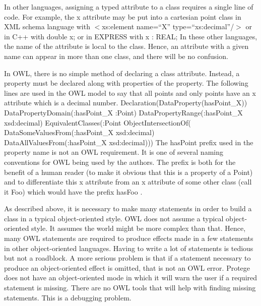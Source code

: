 In other languages, assigning a typed attribute to a class requires a
single line of code. For example, the x attribute may be put into a
cartesian point class in XML schema language with
\newline \sf $<$xs:element name=``X'' type=``xs:decimal''/$>$\rm
\newline or in C++ with
\newline \sf double x; \rm
\newline or in EXPRESS with
\newline \sf x : REAL; \rm \newline
In these other languages, the name of the attribute is local to the class.
Hence, an attribute with a given name can appear in more than one class, and
there will be no confusion.

In OWL, there is no simple method of declaring a class attribute. Instead,
a property must be declared along with properties of the property. The
following lines are used in the OWL model to say that all points and only
points have an x attribute which is a decimal number.
\newline
\newline \sf Declaration(DataProperty(hasPoint\_X))
\newline DataPropertyDomain(:hasPoint\_X :Point)
\newline DataPropertyRange(:hasPoint\_X xsd:decimal)
\newline EquivalentClasses(:Point ObjectIntersectionOf(
\newline DataSomeValuesFrom(:hasPoint\_X xsd:decimal)
\newline DataAllValuesFrom(:hasPoint\_X xsd:decimal))) \rm \newline
\newline
The \sf hasPoint \rm prefix used in the property name is not an OWL
requirement. It is one of several naming conventions for OWL being used by the
authors. The prefix is both for the benefit of a human reader (to make
it obvious that this is a property of a Point) and to differentiate this x
attribute from an x attribute of some other class (call it Foo) which would
have the prefix \sf hasFoo \rm.

As described above, it is necessary to make many statements in order
to build a class in a typical object-oriented style. OWL does not
assume a typical object-oriented style. It assumes the world might
be more complex than that. Hence, many OWL statements are required to
produce effects made in a few statements in other object-oriented
languages. Having to write a lot of statements is tedious but not a
roadblock. A more serious problem is that if a statement necessary to
produce an object-oriented effect is omitted, that is not an OWL
error. Protege does not have an object-oriented mode in which it will warn
the user if a required statement is missing. There are no OWL tools that
will help with finding missing statements. This is a debugging problem.

